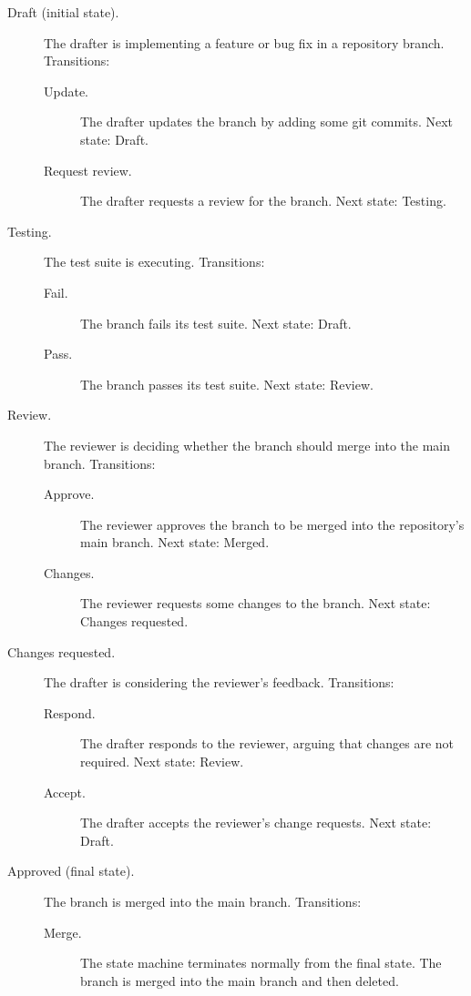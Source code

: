 \documentclass[../midgard.tex]{subfiles}
\begin{document}
\begin{description}
    \item[Draft (initial state).] The drafter is implementing a feature or bug fix in a repository branch.
      Transitions:
        \begin{description}
            \item[Update.] The drafter updates the branch by adding some git commits.
              Next state: Draft.
            \item[Request review.] The drafter requests a review for the branch.
              Next state: Testing.
        \end{description}
    \item[Testing.] The test suite is executing.
      Transitions:
        \begin{description}
            \item[Fail.] The branch fails its test suite.
              Next state: Draft.
            \item[Pass.] The branch passes its test suite.
              Next state: Review.
        \end{description}
    \item[Review.] The reviewer is deciding whether the branch should merge into the main branch.
      Transitions:
        \begin{description}
            \item[Approve.] The reviewer approves the branch to be merged into the repository's main branch.
              Next state: Merged.
            \item[Changes.] The reviewer requests some changes to the branch.
              Next state: Changes requested.
        \end{description}
    \item[Changes requested.] The drafter is considering the reviewer's feedback.
      Transitions:
        \begin{description}
            \item[Respond.] The drafter responds to the reviewer, arguing that changes are not required.
              Next state: Review.
            \item[Accept.] The drafter accepts the reviewer's change requests.
              Next state: Draft.
        \end{description}
    \item[Approved (final state).] The branch is merged into the main branch.
      Transitions:
        \begin{description}
            \item[Merge.] The state machine terminates normally from the final state.
              The branch is merged into the main branch and then deleted.
        \end{description}
\end{description}
\end{document}
